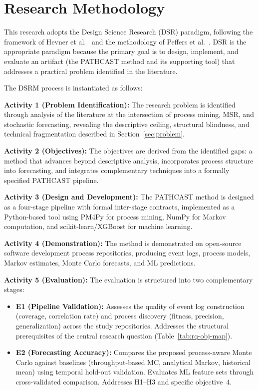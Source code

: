 \section{Research Methodology}
\label{sec:methodology-overview}

This research adopts the Design Science Research (DSR) paradigm, following
the framework of Hevner et al.~\cite{hevner2004} and the methodology
of Peffers et al.~\cite{peffers2007}. DSR is the appropriate paradigm
because the primary goal is to design, implement, and evaluate an artifact
(the PATHCAST method and its supporting tool) that addresses a
practical problem identified in the literature.

The DSRM process is instantiated as follows:

\textbf{Activity 1 (Problem Identification):} The research problem is
identified through analysis of the literature at the intersection of
process mining, MSR, and stochastic forecasting, revealing the descriptive
ceiling, structural blindness, and technical fragmentation described in
Section~\ref{sec:problem}.

\textbf{Activity 2 (Objectives):} The objectives are derived from the
identified gaps: a method that advances beyond descriptive analysis,
incorporates process structure into forecasting, and integrates
complementary techniques into a formally specified PATHCAST pipeline.

\textbf{Activity 3 (Design and Development):} The PATHCAST method
is designed as a four-stage pipeline with formal inter-stage contracts,
implemented as a Python-based tool using PM4Py for process mining, NumPy
for Markov computation, and scikit-learn/XGBoost for machine learning.

\textbf{Activity 4 (Demonstration):} The method is demonstrated on
open-source software development process repositories, producing event logs, process models,
Markov estimates, Monte Carlo forecasts, and ML predictions.

\textbf{Activity 5 (Evaluation):} The evaluation is structured into two
complementary stages:

\begin{itemize}
    \item \textbf{E1 (Pipeline Validation):} Assesses the quality of event
    log construction (coverage, correlation rate) and process discovery
    (fitness, precision, generalization) across the study repositories.
    Addresses the structural prerequisites of the central research question
    (Table~\ref{tab:rq-obj-map}).

    \item \textbf{E2 (Forecasting Accuracy):} Compares the proposed
    process-aware Monte Carlo against baselines (throughput-based MC,
    analytical Markov, historical mean) using temporal hold-out validation.
    Evaluates ML feature sets through cross-validated comparison.
    Addresses H1--H3 and specific objective~4.
\end{itemize}

